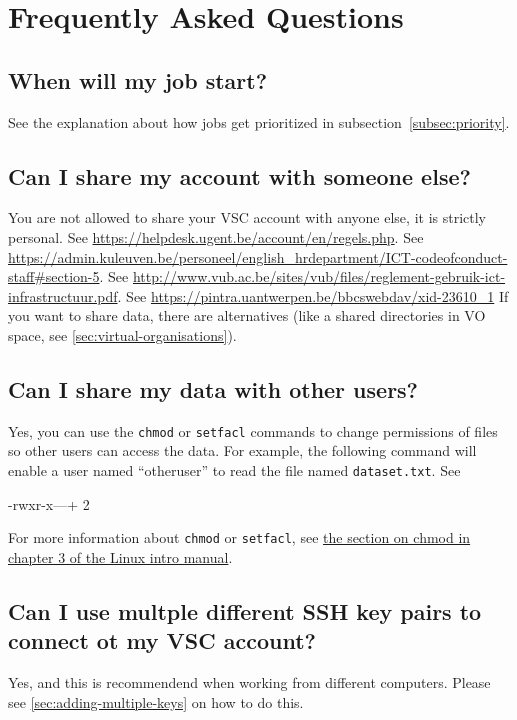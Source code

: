 \chapter{Frequently Asked Questions}
\label{ch:faq}

\ifgent
\section{When will my job start?}

See the explanation about how jobs get prioritized in subsection~\ref{subsec:priority}.

\fi
\section{Can I share my account with someone else?}

 You are not allowed to share your VSC account with anyone else, it is strictly personal.
\ifgent
See \url{https://helpdesk.ugent.be/account/en/regels.php}.
\fi
\ifleuven
See \url{https://admin.kuleuven.be/personeel/english_hrdepartment/ICT-codeofconduct-staff#section-5}.
\fi
\ifbrussel
See \url{http://www.vub.ac.be/sites/vub/files/reglement-gebruik-ict-infrastructuur.pdf}.
\fi
\ifantwerpen
See \url{https://pintra.uantwerpen.be/bbcswebdav/xid-23610_1}
\fi
\ifgent
If you want to share data, there are alternatives (like a shared
directories in VO space, see \autoref{sec:virtual-organisations}).
\fi

\section{Can I share my data with other \hpc users?}

Yes, you can use the \verb|chmod| or \verb|setfacl| commands to change permissions
of files so other users can access the data. For example, the following command
will enable a user named ``otheruser'' to read the file named \verb|dataset.txt|.
See

\begin{prompt}
-rwxr-x---+ 2 %
\end{prompt}

For more information about \verb|chmod| or \verb|setfacl|, see \href{\LinuxManualURL#sec:chmod}
{the section on chmod in chapter 3 of the Linux intro manual}.

\section{Can I use multple different SSH key pairs to connect ot my VSC account?}

Yes, and this is recommendend when working from different computers. Please see
\autoref{sec:adding-multiple-keys} on how to do this.
